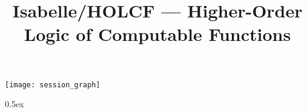 \documentclass[11pt,a4paper]{article}
\begin{document}
\title{Isabelle/HOLCF --- Higher-Order Logic of Computable Functions}
\maketitle

\tableofcontents

\begin{center}
  \texttt{[image: session\_graph]}
\end{center}

\newpage

\renewcommand{\isamarkupheader}[1]%
{\section{\isabellecontext: #1}\markright{THEORY~``\isabellecontext''}}

\parindent 0pt\parskip 0.5ex

\end{document}
